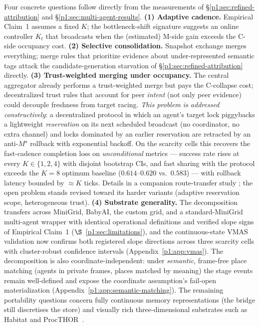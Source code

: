 \documentclass{article}
\begin{document}
Four concrete questions follow directly from the measurements of \S\ref{p1:sec:refined-attribution} and \S\ref{p1:sec:multi-agent-results}.
\textbf{(1) Adaptive cadence.} Empirical Claim~1 assumes a fixed $K$; the bottleneck-shift signature suggests an online controller $K_t$ that broadcasts when the (estimated) M-side gain exceeds the C-side occupancy cost.
\textbf{(2) Selective consolidation.} Snapshot exchange merges everything; merge rules that prioritize evidence about under-represented semantic tags attack the candidate-generation starvation of \S\ref{p1:sec:refined-attribution} directly.
\textbf{(3) Trust-weighted merging under occupancy.} The central aggregator already performs a trust-weighted merge but pays the C-collapse cost; decentralized trust rules that account for peer \emph{intent} (not only peer evidence) could decouple freshness from target racing. \emph{This problem is addressed constructively}: a decentralized protocol in which an agent's target lock piggybacks a lightweight \emph{reservation} on its next scheduled broadcast (no coordinator, no extra channel) and locks dominated by an earlier reservation are retracted by an anti-$M^\star$ rollback with exponential backoff. On the scarcity cells this recovers the fast-cadence completion loss on \emph{unconditional} metrics --- success rate rises at every $K\in\{1,2,4\}$ with disjoint bootstrap CIs, and fast sharing with the protocol exceeds the $K{=}8$ optimum baseline ($0.614$--$0.620$ vs.\ $0.583$) --- with rollback latency bounded by ${\approx}K$ ticks. Details in a companion route-transfer study \citep{songlines2}; the open problem stands revised toward its harder variants (adaptive reservation scope, heterogeneous trust).
\textbf{(4) Substrate generality.} The decomposition transfers across MiniGrid, BabyAI, the custom grid, and a standard-MiniGrid multi-agent wrapper with identical operational definitions and verified slope signs of Empirical Claim~1 ($\S$~\ref{p1:sec:limitations}), and the continuous-state VMAS validation now confirms both registered slope directions across three scarcity cells with cluster-robust confidence intervals (Appendix~\ref{p1:app:vmas}). The decomposition is also coordinate-independent: under \emph{semantic}, frame-free place matching (agents in private frames, places matched by meaning) the stage events remain well-defined and expose the coordinate assumption's fail-open materialization (Appendix~\ref{p1:app:semantic-matching}). The remaining portability questions concern fully continuous memory representations (the bridge still discretises the store) and visually rich three-dimensional substrates such as Habitat and ProcTHOR~\citep{savva2019habitat,deitke2022procthor}.
\end{document}
